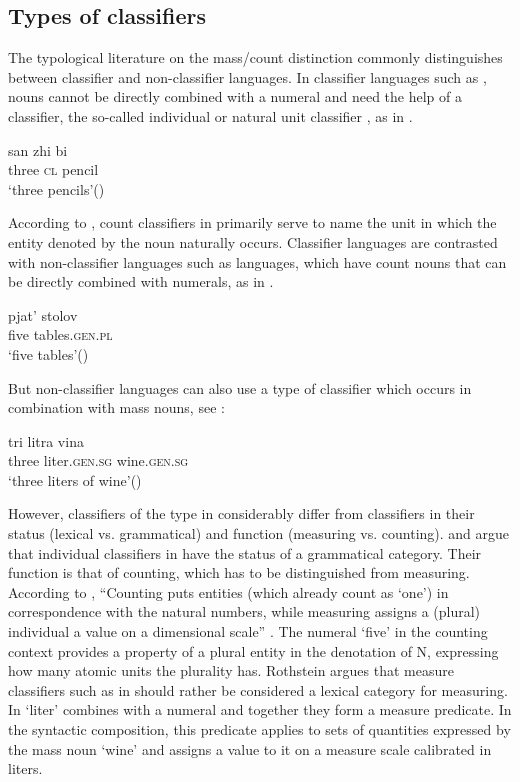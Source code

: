 \documentclass[output=paper]{langscibook}
\begin{document}
\subsection{Types of classifiers}

The typological literature on the mass/count distinction commonly distinguishes between classifier and non-classifier languages. In classifier languages such as , nouns cannot be directly combined with a numeral and need the help of a classifier, the so-called individual or natural unit classifier \citep{Krifka1989, Krifka1995}, as in .

\ea \label{ex:13}
\gll san zhi bi \\
    three \textsc{cl} pencil\\
\glt `three pencils'\hfill ()
\z

\noindent According to \citet{Cheng.Sybesma1999}, count classifiers in  primarily serve to name the unit in which the entity denoted by the noun naturally occurs. Classifier languages are contrasted with non-classifier languages such as  languages, which have count nouns that can be directly combined with numerals, as in .

\ea \label{ex:14}
\gll pjat' stolov \\
    five tables.\textsc{gen.pl}\\
\glt `five tables'\hfill ()
\z

\noindent But non-classifier languages can also use a type of classifier which occurs in combination with mass nouns, see :

\ea \label{ex:15}
\gll tri 	litra 	vina \\
    three	liter.\textsc{gen.sg}	wine.\textsc{gen.sg}\\
\glt `three liters of wine'\hfill ()
\z

\noindent However, classifiers of the type in  considerably differ from  classifiers in their status (lexical vs. grammatical) and function (measuring vs. counting). \citet{Cheng.Sybesma1999} and \citet{Li2013} argue that individual classifiers in  have the status of a grammatical category. Their function is that of counting, which has to be distinguished from measuring. According to \citet{Rothstein2010}, ``Counting puts entities (which already count as `one') in correspondence with the natural numbers, while measuring assigns a (plural) individual a value on a dimensional scale'' \citep[386]{Rothstein2010}. The numeral `five' in the counting context  provides a property of a plural entity in the denotation of N, expressing how many atomic units the plurality has. Rothstein argues that measure classifiers such as in  should rather be considered a lexical category for measuring. In  `liter' combines with a numeral and together they form a measure predicate. In the syntactic composition, this predicate applies to sets of quantities expressed by the mass noun `wine' and assigns a value to it on a measure scale calibrated in liters.
\end{document}
